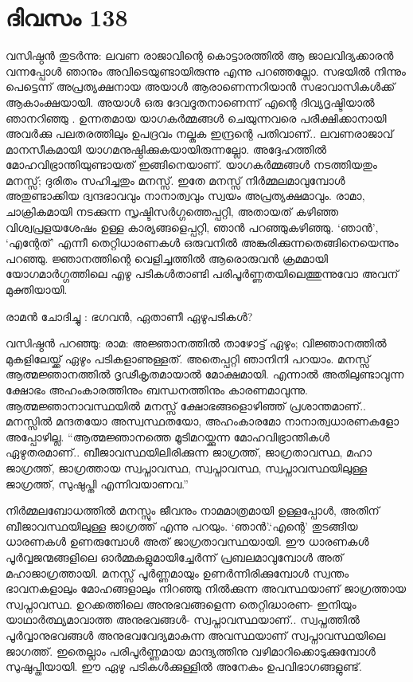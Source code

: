 \newpage
\section{ദിവസം 138}


വസിഷ്ഠൻ തുടർന്നു: ലവണ രാജാവിന്റെ കൊട്ടാരത്തിൽ ആ ജാലവിദ്യക്കാരൻ വന്നപ്പോൾ ഞാനും അവിടെയുണ്ടായിരുന്നു എന്നു പറഞ്ഞല്ലോ. സഭയിൽ നിന്നും പെട്ടെന്ന് അപ്രത്യക്ഷനായ അയാൾ ആരാണെന്നറിയാൻ സഭാവാസികൾക്ക് ആകാംക്ഷയായി. അയാൾ ഒരു ദേവദൂതനാണെന്ന് എന്റെ ദിവ്യദൃഷ്ടിയാൽ ഞാനറിഞ്ഞു . ഉന്നതമായ യാഗകർമ്മങ്ങൾ ചെയുന്നവരെ പരീക്ഷിക്കാനായി അവർക്കു പലതരത്തിലും ഉപദ്രവം നല്കുക ഇന്ദ്രന്റെ പതിവാണ്‌.. ലവണരാജാവ്‌ മാനസീകമായി യാഗമനുഷ്ഠിക്കുകയായിരുന്നല്ലോ. അദ്ദേഹത്തില്‍ മോഹവിഭ്രാന്തിയുണ്ടായത്  ഇങ്ങിനെയാണ്. യാഗകർമ്മങ്ങൾ നടത്തിയതും മനസ്സ്; ദുരിതം സഹിച്ചതും മനസ്സ്. ഇതേ മനസ്സ് നിർമ്മലമാവുമ്പോൾ അതുണ്ടാക്കിയ ദ്വന്ദഭാവവും നാനാത്വവും സ്വയം അപ്രത്യക്ഷമാവും. രാമാ, ചാക്രികമായി നടക്കുന്ന സൃഷ്ടിസർഗ്ഗത്തെപ്പറ്റി, അതായത്  കഴിഞ്ഞ വിശ്വപ്രളയശേഷം ഉള്ള കാര്യങ്ങളെപ്പറ്റി, ഞാൻ പറഞ്ഞുകഴിഞ്ഞു. ‘ഞാൻ’, ‘എന്റേത്’ എന്നീ തെറ്റിധാരണകൾ ഒരുവനിൽ അങ്കുരിക്കുന്നതെങ്ങിനെയെന്നും പറഞ്ഞു. ജ്ഞാനത്തിന്റെ വെളിച്ചത്തിൽ ആരൊരുവൻ ക്രമമായി യോഗമാർഗ്ഗത്തിലെ എഴു പടികൾതാണ്ടി പരിപൂർണ്ണതയിലെത്തുന്നുവോ അവന്‌ മുക്തിയായി.

രാമൻ ചോദിച്ചു : ഭഗവൻ, ഏതാണീ ഏഴുപടികൾ?

വസിഷ്ഠൻ പറഞ്ഞു: രാമ: അജ്ഞാനത്തിൽ താഴോട്ട് ഏഴും; വിജ്ഞാനത്തിൽ മുകളിലേയ്ക്ക് ഏഴും പടികളാണുള്ളത്. അതെപ്പറ്റി ഞാനിനി പറയാം. മനസ്സ് ആത്മജ്ഞാനത്തിൽ ദൃഢീകൃതമായാൽ മോക്ഷമായി. എന്നാല്‍ അതിലുണ്ടാവുന്ന ക്ഷോഭം അഹംകാരത്തിനും ബന്ധനത്തിനും കാരണമാവുന്നു. ആത്മജ്ഞാനാവസ്ഥയിൽ മനസ്സ് ക്ഷോഭങ്ങളൊഴിഞ്ഞ് പ്രശാന്തമാണ്‌.. മനസ്സിൽ മന്ദതയോ അസ്വസ്ഥതയോ, അഹംകാരമോ നാനാത്വധാരണകളോ അപ്പോഴില്ല. “ആത്മജ്ഞാനത്തെ മൂടിമറയ്ക്കുന്ന മോഹവിഭ്രാന്തികൾ ഏഴുതരമാണ്‌.. ബീജാവസ്ഥയിലിരിക്കുന്ന ജാഗ്രത്ത്, ജാഗ്രതാവസ്ഥ, മഹാ ജാഗ്രത്ത്, ജാഗ്രത്തായ സ്വപ്നാവസ്ഥ, സ്വപ്നാവസ്ഥ, സ്വപ്നാവസ്ഥയിലുള്ള ജാഗ്രത്ത്, സുഷുപ്തി എന്നിവയാണവ.”

നിർമ്മലബോധത്തിൽ മനസ്സും ജീവനും നാമമാത്രമായി ഉള്ളപ്പോൾ, അതിന്‌ ബീജാവസ്ഥയിലുള്ള ജാഗ്രത്ത് എന്നു പറയും. ‘ഞാൻ’.‘എന്റെ’ തുടങ്ങിയ ധാരണകൾ ഉണരുമ്പോൾ അത് ജാഗ്രതാവസ്ഥയായി. ഈ ധാരണകൾ പൂർവ്വജന്മങ്ങളിലെ ഓർമ്മകളുമായിച്ചേർന്ന് പ്രബലമാവുമ്പോൾ അത് മഹാജാഗ്രത്തായി. മനസ്സ് പൂർണ്ണമായും ഉണർന്നിരിക്കുമ്പോൾ സ്വന്തം ഭാവനകളാലും മോഹങ്ങളാലും നിറഞ്ഞു നില്‍ക്കുന്ന അവസ്ഥയാണ്‌ ജാഗ്രത്തായ സ്വപ്നാവസ്ഥ. ഉറക്കത്തിലെ അനുഭവങ്ങളെന്ന തെറ്റിദ്ധാരണ- ഇനിയും യാഥാർത്ഥ്യമാവാത്ത അനുഭവങ്ങൾ- സ്വപ്നാവസ്ഥയാണ്‌.. സ്വപ്നത്തിൽ പൂർവ്വാനുഭവങ്ങൾ അനുഭവവേദ്യമാകുന്ന അവസ്ഥയാണ്‌ സ്വപ്നാവസ്ഥയിലെ ജാഗത്ത്. ഇതെല്ലാം പരിപൂർണ്ണമായ മാന്ദ്യത്തിനു വഴിമാറിക്കൊടുക്കുമ്പോൾ സുഷുപ്തിയായി. ഈ ഏഴു പടികൾക്കുള്ളിൽ അനേകം ഉപവിഭാഗങ്ങളുണ്ട്.

